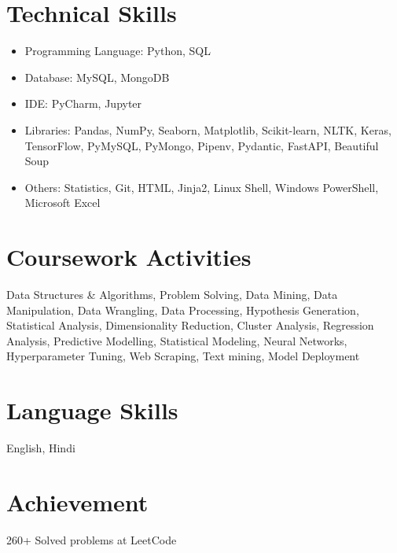 \documentclass[a4paper,11pt]{article}
\begin{document}
\section*{Technical Skills}
\begin{itemize}
  \item Programming Language: Python, SQL
  \item Database: MySQL, MongoDB
  \item IDE: PyCharm, Jupyter
  \item Libraries: Pandas, NumPy, Seaborn, Matplotlib, Scikit-learn, NLTK, Keras, TensorFlow, PyMySQL, PyMongo, Pipenv, Pydantic, FastAPI, Beautiful Soup
  \item Others: Statistics, Git, HTML, Jinja2, Linux Shell, Windows PowerShell, Microsoft Excel
\end{itemize}

\section*{Coursework Activities}
Data Structures \& Algorithms, Problem Solving, Data Mining, Data Manipulation, Data Wrangling, Data Processing, Hypothesis Generation, Statistical Analysis, Dimensionality Reduction, Cluster Analysis, Regression Analysis, Predictive Modelling, Statistical Modeling, Neural Networks, Hyperparameter Tuning, Web Scraping, Text mining, Model Deployment

\section*{Language Skills}
English, Hindi

\section*{Achievement}
260+ Solved problems at LeetCode
\end{document}
